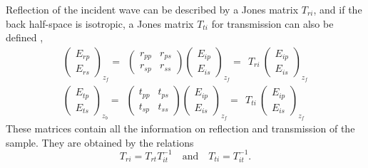 Reflection of the incident wave can be described by a Jones matrix $T_{ri}$, and if the back half-space is isotropic, a Jones matrix $T_{ti}$ for transmission can also be defined \cite{Jones, Fujiwara},
\begin{align*}
\begin{pmatrix}
E_{rp} \\ E_{rs}
\end{pmatrix}_{z_f} \!\! = \ \ 
\begin{pmatrix}
r_{pp} & r_{ps} \\
r_{sp} & r_{ss} 
\end{pmatrix}
\begin{pmatrix}
E_{ip} \\ E_{is}
\end{pmatrix}_{z_f} \!\! = \ \ T_{ri} \ 
\begin{pmatrix}
E_{ip} \\ E_{is}
\end{pmatrix}_{z_f}
\\[3pt]
\begin{pmatrix}
E_{tp} \\ E_{ts}
\end{pmatrix}_{z_b} \!\! = \ \ 
\begin{pmatrix}
t_{pp} & t_{ps} \\
t_{sp} & t_{ss} 
\end{pmatrix}
\begin{pmatrix}
E_{ip} \\ E_{is}
\end{pmatrix}_{z_f} \!\! = \ \ T_{ti} \ 
\begin{pmatrix}
E_{ip} \\ E_{is}
\end{pmatrix}_{z_f}
\end{align*}
These matrices contain all the information on reflection and transmission of the sample. 
They are obtained by the relations 
$$
T_{ri} = T_{rt} T_{it}^{-1} 
\quad\mathrm{and}\quad 
T_{ti} = T_{it}^{-1}.
$$

